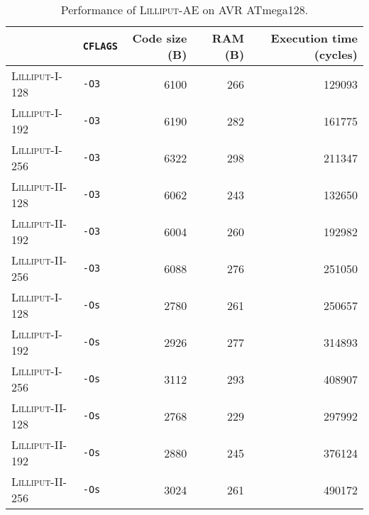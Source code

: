 
\begin{table}[H]
  \centering
  \begin{tabular}{l|l||r|r|r}
      \textbf{}                & \textbf{\texttt{CFLAGS}} & \textbf{Code size (B)} & \textbf{RAM (B)} & \textbf{Execution time (cycles)} \\ \hline
      \textsc{Lilliput-I-128}  & \texttt{-O3}             &                   6100 &              266 &                           129093 \\ \hline
      \textsc{Lilliput-I-192}  & \texttt{-O3}             &                   6190 &              282 &                           161775 \\ \hline
      \textsc{Lilliput-I-256}  & \texttt{-O3}             &                   6322 &              298 &                           211347 \\ \hline
      \textsc{Lilliput-II-128} & \texttt{-O3}             &                   6062 &              243 &                           132650 \\ \hline
      \textsc{Lilliput-II-192} & \texttt{-O3}             &                   6004 &              260 &                           192982 \\ \hline
      \textsc{Lilliput-II-256} & \texttt{-O3}             &                   6088 &              276 &                           251050 \\ \hline
      \textsc{Lilliput-I-128}  & \texttt{-Os}             &                   2780 &              261 &                           250657 \\ \hline
      \textsc{Lilliput-I-192}  & \texttt{-Os}             &                   2926 &              277 &                           314893 \\ \hline
      \textsc{Lilliput-I-256}  & \texttt{-Os}             &                   3112 &              293 &                           408907 \\ \hline
      \textsc{Lilliput-II-128} & \texttt{-Os}             &                   2768 &              229 &                           297992 \\ \hline
      \textsc{Lilliput-II-192} & \texttt{-Os}             &                   2880 &              245 &                           376124 \\ \hline
      \textsc{Lilliput-II-256} & \texttt{-Os}             &                   3024 &              261 &                           490172 \\ \hline
  \end{tabular}
  \caption{Performance of \textsc{Lilliput-AE} on AVR ATmega128.}
  \label{table:results/lilliput-avr}
\end{table}

